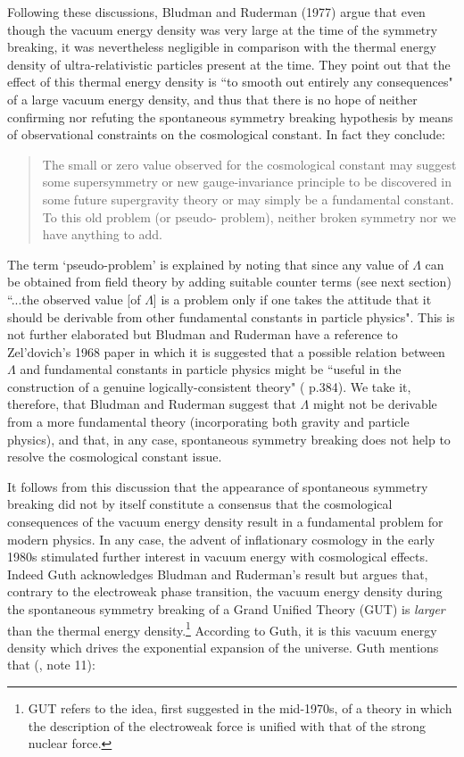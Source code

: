 \documentclass[12pt]{article}
\begin{document}
Following these discussions, Bludman and Ruderman (1977)
\cite{bludman77} argue that even though the vacuum energy density was
very large at the time of the symmetry breaking, it was nevertheless
negligible in comparison with the thermal energy density of
ultra-relativistic particles present at the time. They point out that
the effect of this thermal energy density is ``to smooth out entirely
any consequences" of a large vacuum energy density, and thus that
there is no hope of neither confirming nor refuting the spontaneous
symmetry breaking hypothesis by means of observational constraints on
the cosmological constant. In fact they conclude:
\begin{quote}
The small or zero value observed for the cosmological constant
may suggest some supersymmetry or new gauge-invariance principle
to be discovered in some future supergravity theory or may simply
be a fundamental constant. To this old problem (or pseudo-
problem), neither broken symmetry nor we have anything to add.
\cite{bludman77}
\end{quote}
The term `pseudo-problem' is explained by noting that since any
value of $\Lambda$ can be obtained from field theory by adding
suitable counter terms (see next section) ``...the observed value
[of $\Lambda$] is a problem only if one takes the attitude that it
should be derivable from other fundamental constants in particle
physics". This is not further elaborated but Bludman and Ruderman
have a reference to Zel'dovich's 1968 paper in which it is
suggested that a possible relation between $\Lambda$ and
fundamental constants in particle physics might be ``useful in the
construction of a genuine logically-consistent theory"
(\cite{zeldovich68} p.384). We take it, therefore, that Bludman
and Ruderman suggest that $\Lambda$ might not be derivable from a
more fundamental theory (incorporating both gravity and particle
physics), and that, in any case, spontaneous symmetry breaking
does not help to resolve the cosmological constant issue.

It follows from this discussion that the appearance of spontaneous
symmetry breaking did not by itself constitute a consensus that
the cosmological consequences of the vacuum energy density result
in a fundamental problem for modern physics. In any case, the
advent of inflationary cosmology in the early 1980s stimulated
further interest in vacuum energy with cosmological effects.
Indeed Guth \cite{guth81} acknowledges Bludman and Ruderman's
result but argues that, contrary to the electroweak phase
transition, the vacuum energy density during the spontaneous
symmetry breaking of a Grand Unified Theory (GUT) is {\em
larger} than the thermal energy density.\footnote{GUT refers to
the idea, first suggested in the mid-1970s, of a theory in
which the description of the electroweak force is unified with
that of the strong nuclear force.} According to Guth, it is this
vacuum energy density which drives the exponential expansion of
the universe. Guth mentions that (\cite{guth81}, note 11):
\end{document}
